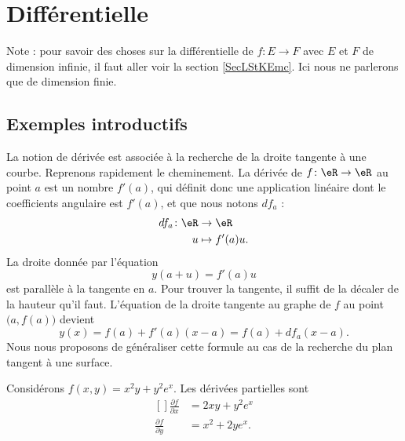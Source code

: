 \section{Différentielle}

Note : pour savoir des choses sur la différentielle de \( f\colon E\to F\) avec \( E\) et \( F\) de dimension infinie, il faut aller voir la section \ref{SecLStKEmc}. Ici nous ne parlerons que de dimension finie.

\subsection{Exemples introductifs}

La notion de dérivée est associée à la recherche de la droite tangente à une courbe. Reprenons rapidement le cheminement. La dérivée de $f\colon \eR\to \eR$ au point $a$ est un nombre $f'(a)$, qui définit donc une application linéaire dont le coefficients angulaire est $f'(a)$, et que nous notons $df_a$ :
\begin{equation}
    \begin{aligned}
        df_a\colon \eR&\to \eR \\
        u&\mapsto f'(a)u. 
    \end{aligned}
\end{equation}
La droite donnée par l'équation
\begin{equation}
    y(a+u)=f'(a)u
\end{equation}
est parallèle à la tangente en $a$. Pour trouver la tangente, il suffit de la décaler de la hauteur qu'il faut. L'équation de la droite tangente au graphe de $f$ au point $\big( a,f(a) \big)$ devient
\begin{equation}        \label{EqDiffRapTgDer}
    y(x)=f(a)+f'(a)(x-a)=f(a)+df_a(x-a).
\end{equation}
Nous nous proposons de généraliser cette formule au cas de la recherche du plan tangent à une surface.

\begin{example}
    Considérons $f(x,y)=x^2y+y^2 e^{x}$. Les dérivées partielles sont
    \begin{equation}
        \begin{aligned}[]
            \frac{ \partial f }{ \partial x }&=2xy+y^2e^x\\
            \frac{ \partial f }{ \partial y }&=x^2+2ye^x.
        \end{aligned}
    \end{equation}
\end{example}

